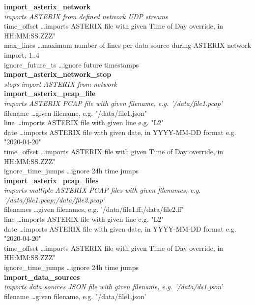 \textbf{import\_asterix\_network} \\
\textit{imports ASTERIX from defined network UDP streams} \\
time\_offset \dots imports ASTERIX file with given Time of Day override, in HH:MM:SS.ZZZ" \\
max\_lines \dots maximum number of lines per data source during ASTERIX network import, 1..4 \\
ignore\_future\_ts \dots ignore future timestamps \\

\textbf{import\_asterix\_network\_stop} \\
\textit{stops import ASTERIX from network} \\

\textbf{import\_asterix\_pcap\_file} \\
\textit{imports ASTERIX PCAP file with given filename, e.g. '/data/file1.pcap'} \\
filename \dots given filename, e.g. "/data/file1.json" \\
line \dots imports ASTERIX file with given line e.g. "L2" \\
date \dots imports ASTERIX file with given date, in YYYY-MM-DD format e.g. "2020-04-20" \\
time\_offset \dots imports ASTERIX file with given Time of Day override, in HH:MM:SS.ZZZ" \\
ignore\_time\_jumps \dots ignore 24h time jumps \\

\textbf{import\_asterix\_pcap\_files} \\
\textit{imports multiple ASTERIX PCAP files with given filenames, e.g. '/data/file1.pcap;/data/file2.pcap'} \\
filenames \dots given filenames, e.g. '/data/file1.ff;/data/file2.ff' \\
line \dots imports ASTERIX file with given line e.g. "L2" \\
date \dots imports ASTERIX file with given date, in YYYY-MM-DD format e.g. "2020-04-20" \\
time\_offset \dots imports ASTERIX file with given Time of Day override, in HH:MM:SS.ZZZ" \\
ignore\_time\_jumps \dots ignore 24h time jumps \\

\textbf{import\_data\_sources} \\
\textit{imports data sources JSON file with given filename, e.g. '/data/ds1.json'} \\
filename \dots given filename, e.g. "/data/file1.json' \\

